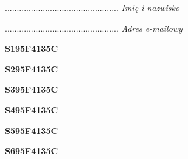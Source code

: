\begin{turn}{90}\begin{minipage}{\linewidth} \vspace{20mm} ................................................  \textit{Imię i nazwisko}\end{minipage}\end{turn}

\begin{turn}{90}\begin{minipage}{\linewidth} \vspace{20mm} ................................................  \textit{Adres e-mailowy}\end{minipage}\end{turn}

\begin{turn}{90}\huge \begin{minipage}{\linewidth} \vspace{10mm}\textbf{S195F4135C}\end{minipage}\end{turn}

\begin{turn}{90}\huge \begin{minipage}{\linewidth} \vspace{10mm}\textbf{S295F4135C}\end{minipage}\end{turn}

\begin{turn}{90}\huge \begin{minipage}{\linewidth} \vspace{10mm}\textbf{S395F4135C}\end{minipage}\end{turn}

\begin{turn}{90}\huge \begin{minipage}{\linewidth} \vspace{10mm}\textbf{S495F4135C}\end{minipage}\end{turn}

\begin{turn}{90}\huge \begin{minipage}{\linewidth} \vspace{10mm}\textbf{S595F4135C}\end{minipage}\end{turn}

\begin{turn}{90}\huge \begin{minipage}{\linewidth} \vspace{10mm}\textbf{S695F4135C}\end{minipage}\end{turn}


